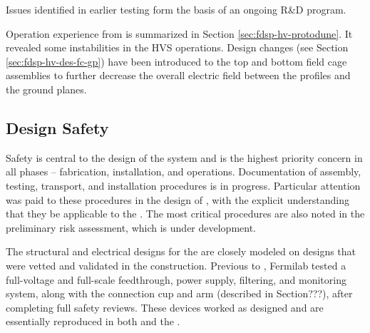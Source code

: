 Issues identified in earlier testing form the basis of an ongoing R\&D program. 


Operation experience from  is summarized in Section \ref{sec:fdsp-hv-protodune}. It revealed some instabilities in the HVS operations.  Design changes (see Section \ref{sec:fdsp-hv-des-fc-gp}) have been introduced to the top and bottom field cage assemblies to further decrease the overall electric field between the profiles and the ground planes.


\subsection{Design Safety}
\label{fdsp-hv-design-safety}


Safety is central to the design of the  system and is the highest priority concern in all phases -- fabrication, installation, and operations. Documentation of assembly, testing, transport, and installation procedures is in progress. Particular attention was paid to these procedures in the design of , with the explicit understanding that they be applicable to the . The most critical procedures are also noted in the preliminary  risk assessment, which is under development. %

The structural and electrical designs for the   are closely modeled on designs that were vetted and validated in the  construction. 
Previous to , Fermilab tested a full-voltage and full-scale  feedthrough, power supply, filtering, and monitoring system, along with the  connection cup and arm (described in Section???), after completing full safety reviews. These devices worked as designed and are essentially reproduced in both  and the . 

